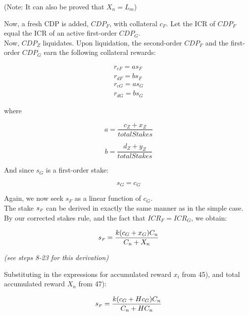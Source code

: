 \documentclass[reqno]{article}
\begin{document}
\bigskip
(Note: It can also be proved that $X_n=L_m$)

\bigskip
Now, a fresh CDP is added, $CDP_F$, with collateral $c_F$.  Let the ICR of $CDP_F$ equal the ICR of an active first-order $CDP_G$.\\

Now, $CDP_Z$ liquidates. Upon liquidation, the second-order $CDP_F$ and the first-order $CDP_G$ earn the following collateral rewards:

\begin{equation}
    \begin{split}
        r_{cF}=as_F\\
        r_{dF}=bs_F\\
        r_{cG}=as_G\\
        r_{dG}=bs_G
    \end{split}
\end{equation}

\bigskip
where

\begin{equation} 
    a=\frac{c_Z+x_Z}{totalStakes}
\end{equation}

\begin{equation} 
    b=\frac{d_Z+y_Z}{totalStakes}
\end{equation}

\bigskip
And since $s_G$ is a first-order stake:

\begin{equation} 
    s_G=c_G
\end{equation}

\bigskip
Again, we now seek $s_F$ as a linear function of $c_G$.\\

The stake $s_\mathsmaller{F}$ can be derived in exactly the same manner as in the simple case. By our corrected stakes rule, and the fact that $ICR_F = ICR_G$, we obtain:

\begin{equation} 
    s_\mathsmaller{F}=\frac{k(c_G+x_G)C_n}{C_n+X_n}
\end{equation}

\begin{center}
   \textit{(see steps 8-23 for this derivation)} 
\end{center} 

\bigskip
Substituting in the expressions for accumulated reward $x_i$ from 45), and total accumulated reward $X_n$ from 47):

\begin{equation} 
    s_\mathsmaller{F}=\frac{k(c_G+Hc_G)C_n}{C_n+HC_n}
\end{equation}
\end{document}
